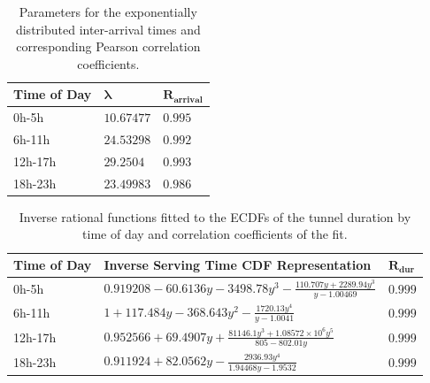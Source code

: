 \documentclass{beamer}
\begin{document}
\begin{frame}
	\begin{table}
	\tiny
	\caption{Parameters for the exponentially distributed inter-arrival times and corresponding Pearson correlation coefficients.}
		\centering
		\begin{tabu}{X[0.9,l]X[r]X[r]} 
		\toprule
		\textbf{Time of Day} & $\mathbf{\lambda}$ & $\mathbf{R_{arrival}}$\\ 
		\midrule
		0h-5h   & $10.67477$ & $0.995$ \\
		6h-11h  & $24.53298$ & $0.992$ \\
		12h-17h & $29.2504$  & $0.993$ \\
		18h-23h & $23.49983$ & $0.986$ \\
		\bottomrule
		\end{tabu}
	\end{table}

	\begin{table}
	\tiny
	\caption{Inverse rational functions fitted to the ECDFs of the tunnel duration by time of day and correlation coefficients of the fit.}
		\centering
		\begin{tabu}{X[1.1,l]X[4.5,r]X[r]} 
		\toprule
		\textbf{Time of Day} & \textbf{Inverse Serving Time CDF Representation} & $\mathbf{R_{dur}}$\\ 
		\midrule
		0h-5h & $0.919208 - 60.6136y - 3498.78y^3 - \frac{110.707y + 2289.94y^3}{y - 1.00469}$ &  $0.999$ \\
		6h-11h & $1 + 117.484y - 368.643y^2 - \frac{1720.13y^4}{y - 1.0041}$ & $0.999$ \\
		12h-17h & $0.952566 + 69.4907y + \frac{81146.1y^3 + 1.08572\times10^6y^5}{805 - 802.01y}$ & $0.999$ \\
		18h-23h & $0.911924 + 82.0562y - \frac{2936.93y^4}{1.94468y - 1.9532}$ & $0.999$ \\
		\bottomrule
		\end{tabu}
	\end{table}
\end{frame}
\end{document}
